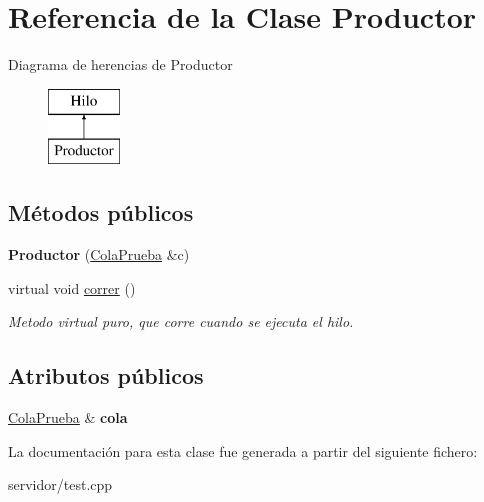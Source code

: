 \hypertarget{classProductor}{\section{\-Referencia de la \-Clase \-Productor}
\label{classProductor}
}
\-Diagrama de herencias de \-Productor\begin{figure}[H]
\begin{center}
\leavevmode
\includegraphics[height=2.000000cm]{classProductor}
\end{center}
\end{figure}
\subsection*{\-Métodos públicos}
\begin{DoxyCompactItemize}
\item 
\hypertarget{classProductor_a773e10ea12b4a52eac351abd686fbf0f}{{\bfseries \-Productor} (\hyperlink{classBLQueue}{\-Cola\-Prueba} \&c)}\label{classProductor_a773e10ea12b4a52eac351abd686fbf0f}

\item 
\hypertarget{classProductor_acdf10ca22775a0a2da3e5a0d4a974fa2}{virtual void \hyperlink{classProductor_acdf10ca22775a0a2da3e5a0d4a974fa2}{correr} ()}\label{classProductor_acdf10ca22775a0a2da3e5a0d4a974fa2}

\begin{DoxyCompactList}\small\item\em \-Metodo virtual puro, que corre cuando se ejecuta el hilo. \end{DoxyCompactList}\end{DoxyCompactItemize}
\subsection*{\-Atributos públicos}
\begin{DoxyCompactItemize}
\item 
\hypertarget{classProductor_ad01c2f057e71b7e599db031ea05cc2c7}{\hyperlink{classBLQueue}{\-Cola\-Prueba} \& {\bfseries cola}}\label{classProductor_ad01c2f057e71b7e599db031ea05cc2c7}

\end{DoxyCompactItemize}


\-La documentación para esta clase fue generada a partir del siguiente fichero\-:\begin{DoxyCompactItemize}
\item 
servidor/test.\-cpp\end{DoxyCompactItemize}
